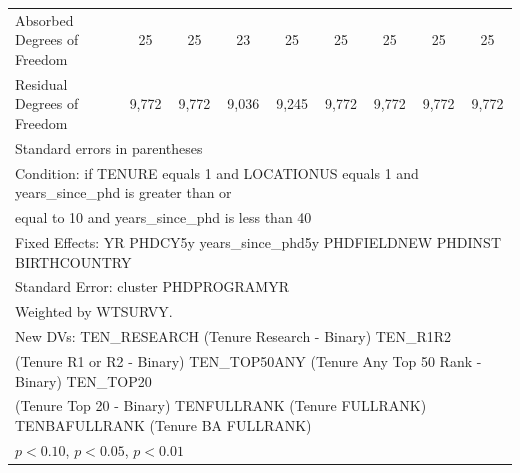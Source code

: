 \begin{table}[htbp]
\begin{tabular}{l*{8}{c}}
Absorbed Degrees of Freedom&          25         &          25         &          23         &          25         &          25         &          25         &          25         &          25         \\
Residual Degrees of Freedom&       9,772         &       9,772         &       9,036         &       9,245         &       9,772         &       9,772         &       9,772         &       9,772         \\
\hline\hline
\multicolumn{9}{l}{\footnotesize Standard errors in parentheses}\\
\multicolumn{9}{l}{\footnotesize Condition: if TENURE equals 1 and LOCATIONUS equals 1 and years\_since\_phd is greater than or}\\
\multicolumn{9}{l}{\footnotesize equal to 10 and years\_since\_phd is less than 40}\\
\multicolumn{9}{l}{\footnotesize Fixed Effects: YR PHDCY5y years\_since\_phd5y PHDFIELDNEW PHDINST BIRTHCOUNTRY}\\
\multicolumn{9}{l}{\footnotesize Standard Error: cluster PHDPROGRAMYR}\\
\multicolumn{9}{l}{\footnotesize Weighted by WTSURVY.}\\
\multicolumn{9}{l}{\footnotesize New DVs: TEN\_RESEARCH (Tenure Research - Binary) TEN\_R1R2}\\
\multicolumn{9}{l}{\footnotesize (Tenure R1 or R2 - Binary) TEN\_TOP50ANY (Tenure Any Top 50 Rank - Binary) TEN\_TOP20}\\
\multicolumn{9}{l}{\footnotesize (Tenure Top 20 - Binary) TENFULLRANK (Tenure FULLRANK) TENBAFULLRANK (Tenure BA FULLRANK)}\\
\multicolumn{9}{l}{\footnotesize \sym{*} \(p<0.10\), \sym{**} \(p<0.05\), \sym{***} \(p<0.01\)}\\
\end{tabular}
\end{table}
